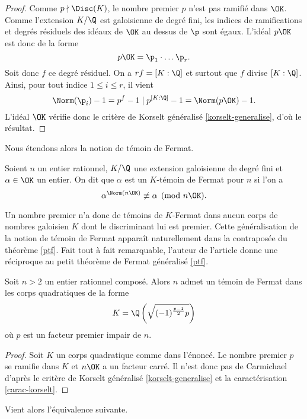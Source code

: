 \begin{proof}
	Comme $p\nmid \Disc(K)$, le nombre premier $p$ n'est pas ramifié dans $\OK$. Comme l'extension $K/\Q$ est galoisienne de degré fini, les indices de ramifications et degrés résiduels des idéaux de $\OK$ au dessus de $\p$ sont égaux. L'idéal $p\OK$ est donc de la forme \[p\OK = \p_1\cdot \dots \p_r.\] Soit donc $f$ ce degré résiduel. On a $rf = [K : \Q]$ et surtout que $f$ divise $[ K : \Q ]$. Ainsi, pour tout indice $1\leq i \leq r$, il vient \[ \Norm(\p_i) - 1 = p^f - 1 \mid p^{[K : \Q]} - 1 = \Norm(p\OK) - 1.\] L'idéal $\OK$ vérifie donc le critère de Korselt généralisé \ref{korselt-generalise}, d'où le résultat.
\end{proof}

Nous étendons alors la notion de témoin de Fermat.

\begin{definition}\label{def-K-temoin}
	Soient $n$ un entier rationnel, $K/\Q$ une extension galoisienne de degré fini et $\alpha\in \OK$ un entier. On dit que $\alpha$ est un $K$-témoin de Fermat pour $n$ si l'on a \[\alpha^{\Norm(n\OK)} \not \equiv \alpha \pmod{n\OK}.\]
\end{definition}

Un nombre premier n'a donc de témoins de $K$-Fermat dans aucun corps de nombres galoisien $K$ dont le discriminant lui est premier. Cette généralisation de la notion de témoin de Fermat apparaît naturellement dans la contraposée du théorème \ref{ptf}. Fait tout à fait remarquable, l'auteur de l'article donne une réciproque au petit théorème de Fermat généralisé \ref{ptf}.

\begin{theoreme}\label{ptf-reciproque}
	Soit $n>2$ un entier rationnel composé. Alors $n$ admet un témoin de Fermat dans les corps quadratiques de la forme \[K = \Q\left(\sqrt{(-1)^{\frac{p-1}{2}}p}\right)\] où $p$ est un facteur premier impair de $n$.
\end{theoreme}

\begin{proof}
	Soit $K$ un corps quadratique comme dans l'énoncé. Le nombre premier $p$ se ramifie dans $K$ et $n\OK$ a un facteur carré. Il n'est donc pas de Carmichael d'après le critère de Korselt généralisé \ref{korselt-generalise} et la caractérisation \ref{carac-korselt}.
\end{proof}


Vient alors l'équivalence suivante.

